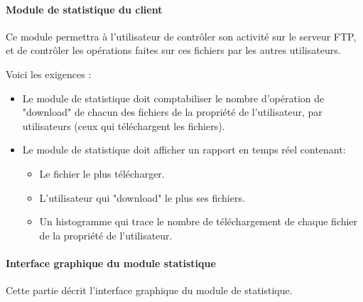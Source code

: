 \documentclass[10pt,a4paper]{report}
\begin{document}
\paragraph{\textbf{Module de statistique du client\\}}

Ce module permettra à l'utilisateur de contrôler son activité sur le serveur FTP, et de contrôler les opérations faites sur ces fichiers par les autres utilisateurs.

Voici les exigences :
\begin{itemize}[label = $\triangleright$]

\item Le module de statistique doit comptabiliser le nombre d'opération de "download" de chacun des fichiers de la propriété de l'utilisateur, par utilisateurs (ceux qui téléchargent les fichiers).

\item Le module de statistique doit afficher un rapport en temps réel contenant: 

\begin{itemize}
\item Le fichier le plus télécharger.

\item L'utilisateur qui "download" le plus ses fichiers.

\item Un histogramme qui trace le nombre de téléchargement de chaque fichier de la propriété de l'utilisateur.
\end{itemize} 
\end{itemize}

\paragraph{\textbf{Interface graphique du module statistique\\}}

Cette partie décrit l'interface graphique du module de statistique.
\end{document}
